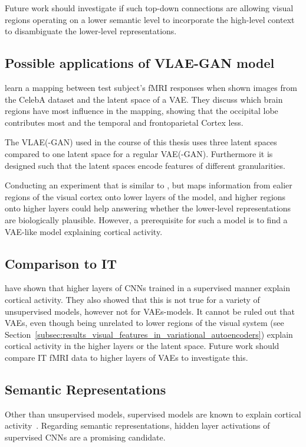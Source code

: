 Future work should investigate if such top-down connections are allowing visual regions operating on a lower semantic level to incorporate the high-level context to disambiguate the lower-level representations.

\subsection{Possible applications of VLAE-GAN model}\label{subsec:possible-applications-of-vlae-gan-model}
\citet{vanrullen2019reconstructing} learn a mapping between test subject's fMRI responses when shown images from the CelebA dataset and the latent space of a \ac{VAE}.
They discuss which brain regions have most influence in the mapping, showing that the occipital lobe contributes most and the temporal and frontoparietal Cortex less.

The \ac{VLAE}(-\ac{GAN}) used in the course of this thesis uses three latent spaces compared to one latent space for a regular \ac{VAE}(-\ac{GAN}).
Furthermore it is designed such that the latent spaces encode features of different granularities.

Conducting an experiment that is similar to \citet{vanrullen2019reconstructing}, but maps information from ealier regions of the visual cortex onto lower layers of the model, and higher regions onto higher layers could help answering whether the lower-level representations are biologically plausible.
However, a prerequisite for such a model is to find a \ac{VAE}-like model explaining cortical activity.

\subsection{Comparison to \ac{IT}}\label{subsec:representational-dissimilarity-matrices}
\citet{khaligh2014deep} have shown that higher layers of \acp{CNN} trained in a supervised manner explain cortical activity.
They also showed that this is not true for a variety of unsupervised models, however not for \acp{VAE}-models.
It cannot be ruled out that \acp{VAE}, even though being unrelated to lower regions of the visual system (see Section~\ref{subsec:results_visual_features_in_variational_autoencoders}) explain cortical activity in the higher layers or the latent space.
Future work should compare \ac{IT} fMRI data to higher layers of \acp{VAE} to investigate this.

\subsection{Semantic Representations}\label{subsec:semantic-representations-results}
Other than unsupervised models, supervised models are known to explain cortical activity~\citep{khaligh2014deep,cadieu2014deep}.
Regarding semantic representations, hidden layer activations of supervised \acp{CNN} are a promising candidate.

